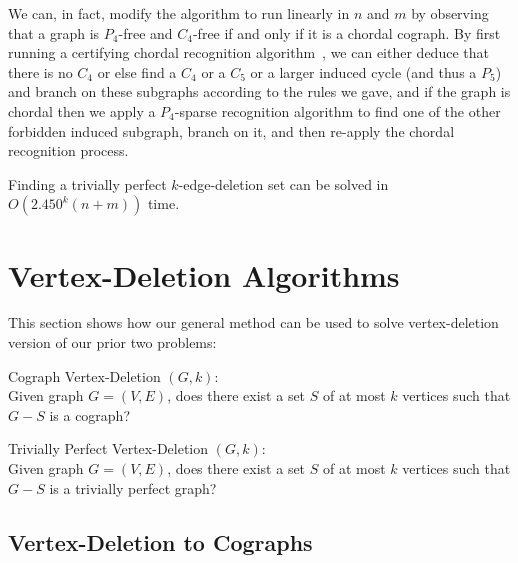 \documentclass{llncs}
\begin{document}
We can, in fact, modify the algorithm to run linearly in $n$ and $m$ by observing that a graph is $P_4$-free and $C_4$-free if and only if it is a chordal cograph. By first running a certifying chordal recognition algorithm~\cite{TaYa}, we can either deduce that there is no $C_4$ or else find a $C_4$ or a $C_5$ or a larger induced cycle (and thus a $P_5$) and branch on these subgraphs according to the rules we gave, and if the graph is chordal then we apply a $P_4$-sparse recognition algorithm to find one of the other forbidden induced subgraph, branch on it, and then re-apply the chordal recognition process.

\begin{theorem}
Finding a trivially perfect $k$-edge-deletion set can be solved in $O(2.450^k(n+m))$ time.
\end{theorem}



\section{Vertex-Deletion Algorithms}

This section shows how our general method can be used to solve vertex-deletion version of our prior two problems:

\begin{problem}{\sc Cograph Vertex-Deletion} $(G, k)$:\\
Given graph $G=(V,E)$, does there exist a set $S$ of at most $k$ vertices such that $G-S$ is a cograph?
\end{problem}

\begin{problem}{\sc Trivially Perfect Vertex-Deletion} $(G, k)$:\\
Given graph $G=(V,E)$, does there exist a set $S$ of at most $k$ vertices such that $G-S$ is a trivially perfect graph?
\end{problem}

\subsection{Vertex-Deletion to Cographs}
\end{document}
